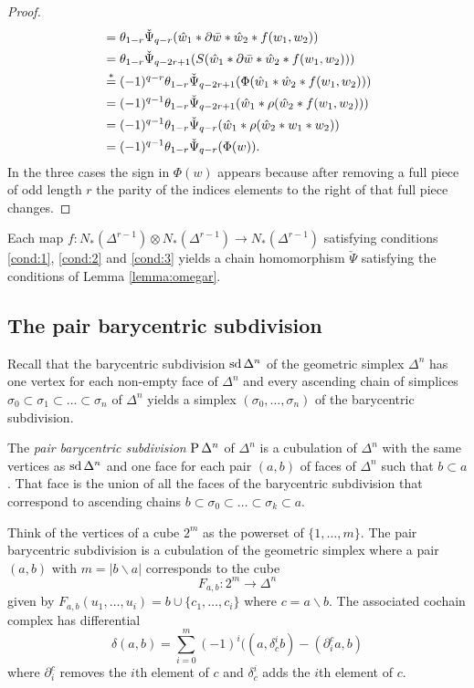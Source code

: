 \begin{proof}
\begin{align*}
		&= \theta_{1-r}\check{\Psi}_{q-r}(\hat{w}_1*\partial\bar{w}*\hat{w}_2*f(w_1,w_2)) \\
		&= \theta_{1-r}\check{\Psi}_{q-2r+1}(S(\hat{w}_1*\partial\bar{w}*\hat{w}_2*f(w_1,w_2)))\\
	    &\overset{*}{=} (-1)^{q-r} \theta_{1-r}\check{\Psi}_{q-2r+1}(\Phi(\hat{w}_1*\hat{w}_2*f(w_1,w_2))) \\
		&= (-1)^{q-1} \theta_{1-r}\check{\Psi}_{q-2r+1}(\hat{w}_1*\rho(\hat{w}_2*f(w_1,w_2)))\\
		&= (-1)^{q-1} \theta_{1-r}\check{\Psi}_{q-r}(\hat{w}_1*\rho(\hat{w}_2*w_1*w_2))\\
		&= (-1)^{q-1}\theta_{1-r}\check{\Psi}_{q-r}(\Phi(w)). \qedhere
	\end{align*}
In the three cases the sign in $\Phi(w)$ appears because after removing a full piece of odd length $r$ the parity of the indices elements to the right of that full piece changes.
\end{proof}

\begin{corollary} Each map $f\colon N_*(\Delta^{r-1})\otimes N_*(\Delta^{r-1})\to N_*(\Delta^{r-1})$ satisfying conditions \eqref{cond:1}, \eqref{cond:2} and \eqref{cond:3} yields a chain homomorphism $\check{\Psi}$ satisfying the conditions of Lemma \ref{lemma:omegar}.
\end{corollary}

\subsection{The pair barycentric subdivision} Recall that the barycentric subdivision $\operatorname{sd} \Delta^n$ of the geometric simplex $\Delta^n$ has one vertex for each non-empty face of $\Delta^n$ and every ascending chain of simplices $\sigma_0\subset \sigma_1\subset\ldots \subset \sigma_n$ of $\Delta^n$ yields a simplex $(\sigma_0,\ldots,\sigma_n)$ of the barycentric subdivision. 

The \emph{pair barycentric subdivision} $\operatorname{P} \Delta^n$ of $\Delta^n$ is a cubulation of $\Delta^n$ with the same vertices as $\operatorname{sd} \Delta^n$ and one face for each pair $(a,b)$ of faces of $\Delta^n$ such that $b\subset a$. That face is the union of all the faces of the barycentric subdivision that correspond to ascending chains $b\subset \sigma_0\subset \ldots\subset \sigma_k\subset a$. 

Think of the vertices of a cube $2^m$ as the powerset of $\{1,\ldots,m\}$. The pair barycentric subdivision is a cubulation of the geometric simplex where a pair $(a,b)$ with $m=|b\smallsetminus a|$ corresponds to the cube
\[F_{a,b}\colon 2^{m}\to \Delta^n\]
given by $F_{a,b}(u_1,\ldots,u_i) = b\cup \{c_1,\ldots,c_i\}$ where $c=a\smallsetminus b$. The associated cochain complex has differential
\[\delta(a,b) = \sum_{i=0}^m (-1)^i((a,\delta^i_c b)-(\partial^c_i a,b)\]
where $\partial_i^c$ removes the $i$th element of $c$ and $\delta^i_c$ adds the $i$th element of $c$.


